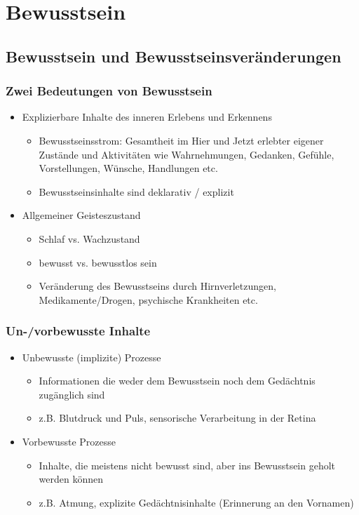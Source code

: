 \section{Bewusstsein}
\subsection{Bewusstsein und Bewusstseinsveränderungen}
\subsubsection{Zwei Bedeutungen von \glqq{}Bewusstsein\grqq{}}
\begin{itemize}
	\item Explizierbare Inhalte des inneren Erlebens und Erkennens
		\begin{itemize}
			\item Bewusstseinsstrom: Gesamtheit im \glqq{}Hier und Jetzt\grqq{} erlebter eigener Zustände und Aktivitäten wie Wahrnehmungen, Gedanken, Gefühle, Vorstellungen, Wünsche, Handlungen etc.
			\item Bewusstseinsinhalte sind deklarativ / explizit
		\end{itemize}
	\item Allgemeiner Geisteszustand
		\begin{itemize}
			\item Schlaf vs. Wachzustand
			\item bewusst vs. bewusstlos sein
			\item Veränderung des Bewusstseins durch Hirnverletzungen, Medikamente/Drogen, psychische Krankheiten etc.
		\end{itemize}	
\end{itemize}
\subsubsection{Un-/vorbewusste Inhalte}
\begin{itemize}
	\item Unbewusste (implizite) Prozesse
		\begin{itemize}
			\item Informationen die weder dem Bewusstsein noch dem Gedächtnis zugänglich sind
			\item z.B. Blutdruck und Puls, sensorische Verarbeitung in der Retina
		\end{itemize}
	\item Vorbewusste Prozesse
		\begin{itemize}
			\item Inhalte, die meistens nicht bewusst sind, aber ins Bewusstsein geholt werden können
			\item z.B. Atmung, explizite Gedächtnisinhalte (Erinnerung an den Vornamen)
		\end{itemize}
\end{itemize}
